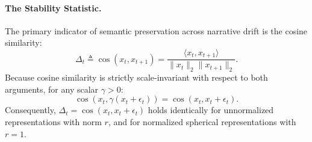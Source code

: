 \paragraph{The Stability Statistic.}
The primary indicator of semantic preservation across narrative drift is the cosine similarity:
\begin{equation}
\Delta_t \triangleq \cos(x_t, x_{t+1}) = \frac{\langle x_t, x_{t+1} \rangle}{\|x_t\|_2 \|x_{t+1}\|_2}.
\end{equation}
Because cosine similarity is strictly scale-invariant with respect to both arguments, for any scalar $\gamma > 0$:
\begin{equation}
\cos(x_t, \gamma(x_t + \epsilon_t)) = \cos(x_t, x_t + \epsilon_t).
\end{equation}
Consequently, $\Delta_t = \cos(x_t, x_t + \epsilon_t)$ holds identically for unnormalized representations with norm $r$, and for normalized spherical representations with $r = 1$.
